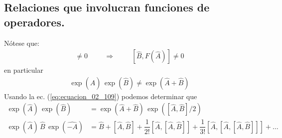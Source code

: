 \subsection{Relaciones que involucran funciones de operadores.}

Nótese que:
\begin{align}
[\hat{A}, \hat{B}] \neq 0 \hspace{1cm} \Longrightarrow \hspace{1cm} [\hat{B} , F(\hat{A}) ] \neq 0
\label{eq:ecuacion_02_115}
\end{align}
en particular
\begin{align*}
\exp(\hat{A}) \, \exp(\hat{B}) \neq \exp(\hat{A} + \hat{B})
\end{align*}
Usando la ec. (\ref{eq:ecuacion_02_109}) podemos determinar que
\begin{align}
\exp(\hat{A}) \, \exp(\hat{B}) &= \exp(\hat{A} + \hat{B}) \, \exp([\hat{A}, \hat{B}]/2) \label{eq:ecuacion_02_116} \\[1em]
\exp(\hat{A}) \, \hat{B} \, \exp(\hat{-A}) &= \hat{B} + [\hat{A}, \hat{B}] + \dfrac{1}{2!} [\hat{A}, [\hat{A}, \hat{B}]] + \dfrac{1}{3!} [\hat{A}, [ \hat{A}, [\hat{A}, \hat{B}]]] + \ldots \label{eq:ecuacion_02_117}
\end{align}

